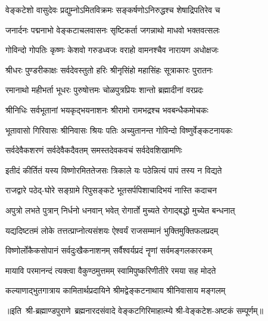 

\twolineshloka
{वेङ्कटेशो वासुदेवः प्रद्युम्नोऽमितविक्रमः}
{सङ्कर्षणोऽनिरुद्धश्च शेषाद्रिपतिरेव च}

\twolineshloka
{जनार्दनः पद्मनाभो वेङ्कटाचलवासनः}
{सृष्टिकर्ता जगन्नाथो माधवो भक्तवत्सलः}

\twolineshloka
{गोविन्दो गोपतिः कृष्णः केशवो गरुडध्वजः}
{वराहो वामनश्चैव नारायण अधोक्षजः}

\twolineshloka
{श्रीधरः पुण्डरीकाक्षः सर्वदेवस्तुतो हरिः}
{श्रीनृसिंहो महासिंहः सूत्राकारः पुरातनः}

\twolineshloka
{रमानाथो महीभर्ता भूधरः पुरुषोत्तमः}
{चोळपुत्रप्रियः शान्तो ब्रह्मादीनां वरप्रदः}

\twolineshloka
{श्रीनिधिः सर्वभूतानां भयकृद्भयनाशनः}
{श्रीरामो रामभद्रश्च भवबन्धैकमोचकः}

\twolineshloka
{भूतावासो गिरिवासः श्रीनिवासः श्रियः पतिः}
{अच्युतानन्त गोविन्दो विष्णुर्वेङ्कटनायकः}

\twolineshloka
{सर्वदेवैकशरणं सर्वदेवैकदैवतम्}
{समस्तदेवकवचं सर्वदेवशिखामणिः}

\twolineshloka
{इतीदं कीर्तितं यस्य विष्णोरमिततेजसः}
{त्रिकाले यः पठेन्नित्यं पापं तस्य न विद्यते}

\twolineshloka
{राजद्वारे पठेद्-घोरे सङ्ग्रामे रिपुसङ्कटे}
{भूतसर्पपिशाचादिभयं नास्ति कदाचन}

\twolineshloka
{अपुत्रो लभते पुत्रान् निर्धनो धनवान् भवेत्}
{रोगार्तो मुच्यते रोगाद्बद्धो मुच्येत बन्धनात्}

\twolineshloka
{यद्यदिष्टतमं लोके तत्तत्प्राप्नोत्यसंशयः}
{ऐश्वर्यं राजसम्मानं भुक्तिमुक्तिफलप्रदम्}

\twolineshloka
{विष्णोर्लोकैकसोपानं सर्वदुःखैकनाशनम्}
{सर्वैश्वर्यप्रदं नॄणां सर्वमङ्गलकारकम्}

\twolineshloka
{मायावि परमानन्दं त्यक्त्वा वैकुण्ठमुत्तमम्}
{स्वामिपुष्करिणीतीरे रमया सह मोदते}

\twolineshloka
{कल्याणाद्भुतगात्राय कामितार्थप्रदायिने}
{श्रीमद्वेङ्कटनाथाय श्रीनिवासाय मङ्गलम्}

॥इति~श्री-ब्रह्माण्डपुराणे~ब्रह्मनारदसंवादे वेङ्कटगिरिमाहात्म्ये श्री-वेङ्कटेश-अष्टकं सम्पूर्णम्॥